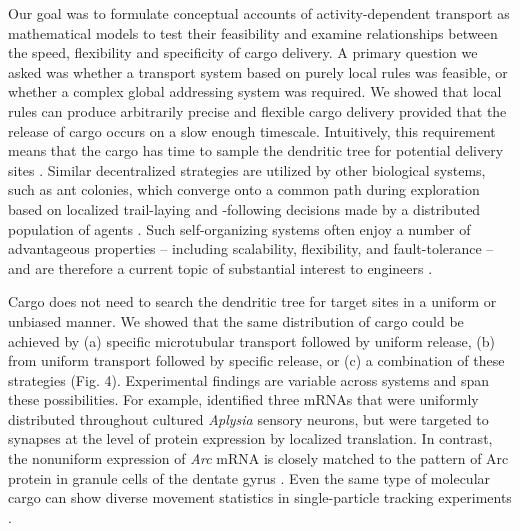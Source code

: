 \documentclass[11pt]{wlpeerj}
\begin{document}
Our goal was to formulate conceptual accounts of activity-dependent transport as mathematical models to test their feasibility and examine relationships between the speed, flexibility and specificity of cargo delivery.
A primary question we asked was whether a transport system based on purely local rules was feasible, or whether a complex global addressing system was required.
We showed that local rules can produce arbitrarily precise and flexible cargo delivery provided that the release of cargo occurs on a slow enough timescale.
Intuitively, this requirement means that the cargo has time to sample the dendritic tree for potential delivery sites \citep{Welte2004}.
Similar decentralized strategies are utilized by other biological systems, such as ant colonies, which converge onto a common path during exploration based on localized trail-laying and -following decisions made by a distributed population of agents \citep{Deneubourg_1990}.
Such self-organizing systems often enjoy a number of advantageous properties -- including scalability, flexibility, and fault-tolerance -- and are therefore a current topic of substantial interest to engineers \citep{Werfel2014,Rubenstein2014}.

Cargo does not need to search the dendritic tree for target sites in a uniform or unbiased manner.
We showed that the same distribution of cargo could be achieved by (a) specific microtubular transport followed by uniform release, (b) from uniform transport followed by specific release, or (c) a combination of these strategies (Fig. 4).
Experimental findings are variable across systems and span these possibilities.
For example, \cite{Kim_2015} identified three mRNAs that were uniformly distributed throughout cultured \textit{Aplysia} sensory neurons, but were targeted to synapses at the level of protein expression by localized translation.
In contrast, the nonuniform expression of \textit{Arc} mRNA is closely matched to the pattern of Arc protein in granule cells of the dentate gyrus \citep{Steward_1998,Farris_2014, Steward_2015}.
Even the same type of molecular cargo can show diverse movement statistics in single-particle tracking experiments \citep{Dynes_2007}.
\end{document}
